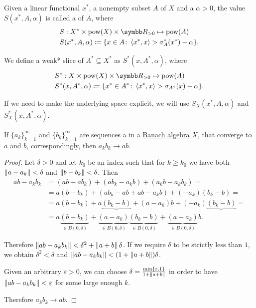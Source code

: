 \begin{Definition}\label{def:banach_space_slice}\cite[definition 2.17]{Phelps1993}
  Given a linear functional \( x^* \), a nonempty subset \( A \) of \( X \) and a  \( \alpha > 0 \), the value \( S(x^*, A, \alpha) \) is called a  of \( A \), where
  \begin{align*}
    &S: X^* \times \Pow(X) \times \BR_{>0} \mapsto \Pow(A) \\
    &S(x^*, A, \alpha) \coloneqq \{ x \in A \colon \Prod {x^*} x > \sigma_A^*(x^*) - \alpha \}.
  \end{align*}

  We define a weak* slice of \( A^* \subseteq X^* \) as \( S^*(x, A^*, \alpha) \), where
  \begin{align*}
    &S^*: X \times \Pow(X) \times \BR_{>0} \mapsto \Pow(A) \\
    &S^*(x, A^*, \alpha) \coloneqq \{ x^* \in A^* \colon \Prod {x^*} x > \sigma_{A^*}(x) - \alpha \}.
  \end{align*}

  If we need to make the underlying space explicit, we will use \( S_X(x^*, A, \alpha) \) and \( S_X^*(x, A^*, \alpha) \).
\end{Definition}

\begin{Proposition}
  If \( \{ a_k \}_{k=1}^\infty \) and \( \{ b_k \}_{k=1}^\infty \) are sequences a in a \hyperref[def:banach_space]{Banach} \hyperref[def:algebra_over_ring]{algebra} \( X \), that converge to \( a \) and \( b \), correspondingly, then \( a_k b_k \to a b \).
\end{Proposition}
\begin{proof}
  Let \( \delta > 0 \) and let \( k_0 \) be an index such that for \( k \geq k_0 \) we have both \( \left\Vert a - a_k \right\Vert < \delta \) and \( \left\Vert b - b_k \right\Vert < \delta \). Then
  \begin{align*}
    ab - a_k b_k
    &=
    (ab - a b_k) + (a b_k - a_k b) + (a_k b - a_k b_k)
    = \\ &=
    a (b - b_k) + (a b_k - ab + ab - a_k b) + (-a_k)(b_k - b)
    = \\ &=
    a (b - b_k) + a \underbrace{(b_k - b)} + (a - a_k) b + (-a_k)\underbrace{(b_k - b)}
    = \\ &=
    a \underbrace{(b - b_k)}_{\in B(0, \delta)} + \underbrace{(a - a_k)}_{\in B(0, \delta)} \underbrace{(b_k - b)}_{\in B(0, \delta)} + \underbrace{(a - a_k)}_{\in B(0, \delta)} b.
  \end{align*}

  Therefore \( \left\Vert ab - a_k b_k \right\Vert < \delta^2 + \left\Vert a + b \right\Vert \delta \). If we require \( \delta \) to be strictly less than \( 1 \), we obtain \( \delta^2 < \delta \) and \( \left\Vert ab - a_k b_k \right\Vert < (1 + \left\Vert a + b \right\Vert) \delta \).

  Given an arbitrary \( \varepsilon > 0 \), we can choose \( \delta = \tfrac {\min \{\varepsilon, 1 \}} {1 + \left\Vert a + b \right\Vert} \) in order to have \( \left\Vert ab - a_k b_k \right\Vert < \varepsilon \) for some large enough \( k \).

  Therefore \( a_k b_k \to a b \).
\end{proof}

